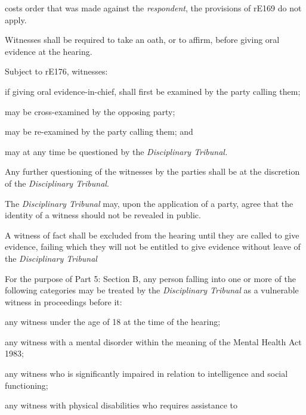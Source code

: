 costs order that was made against the \emph{respondent}, the provisions
of rE169 do not apply.\\
\par
{}
Witnesses shall be required to take an oath, or to affirm, before giving
oral evidence at the hearing.\\
\par
Subject to rE176, witnesses:\\\nl \item if giving oral evidence-in-chief, shall first be examined by the
party calling them;\item may be cross-examined by the opposing party;\item may be re-examined by the party calling them; and\item may at any time be questioned by the \emph{Disciplinary Tribunal.}\ln
{}\par
Any further questioning of the witnesses by the parties shall be at the
discretion of the \emph{Disciplinary Tribunal}.\\
\par
The \emph{Disciplinary Tribunal} may, upon the application of a party,
agree that the identity of a witness should not be revealed in public.\ln
{}\par
A witness of fact shall be excluded from the hearing until they are
called to give evidence, failing which they will not be entitled to give
evidence without leave of the \emph{Disciplinary Tribunal}\par
{}\par
{}
For the purpose of Part 5: Section B, any person falling into one or
more of the following categories may be treated by
the \emph{Disciplinary Tribunal }as a vulnerable witness in proceedings
before it:\\\nl \item any witness under the age of 18 at the time of the hearing;\item any witness with a mental disorder within the meaning of the Mental
Health Act 1983;\item any witness who is significantly impaired in relation to intelligence
and social functioning;\item any witness with physical disabilities who requires assistance to

